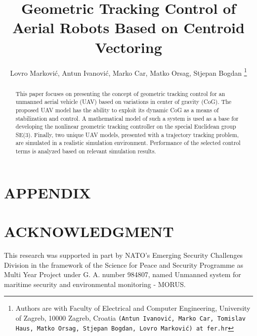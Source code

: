 \documentclass[letterpaper, 10 pt, conference]{ieeeconf}  %
\title{\LARGE \bf
Geometric Tracking Control of Aerial Robots Based on Centroid Vectoring
}
\author{Lovro Marković, Antun Ivanović, Marko Car, Matko Orsag, Stjepan Bogdan
	\thanks{Authors are with Faculty of Electrical and Computer Engineering,
        University of Zagreb, 10000 Zagreb, Croatia
        {\tt\small (Antun Ivanović, Marko Car, Tomislav Haus, Matko Orsag, Stjepan Bogdan, Lovro Marković) at fer.hr}}}%
\begin{document}
\maketitle

\thispagestyle{empty}
\pagestyle{empty}


\begin{abstract}

This paper focuses on presenting the concept of geometric tracking control for an unmanned aerial vehicle (UAV) based on variations in center of gravity (CoG). The proposed UAV model has the ability to exploit its dynamic CoG as a means of stabilization and control. A mathematical model of such a system is used as a base for developing the nonlinear geometric tracking controller on the special Euclidean group SE(3). Finally, two unique UAV models, presented with a trajectory tracking problem, are simulated in a realistic simulation environment. Performance of the selected control terms is analyzed based on relevant simulation results.

\end{abstract}




%




\section*{APPENDIX} \label{sec:appendix}



\section*{ACKNOWLEDGMENT}

This research was supported in part by NATO's Emerging Security Challenges Division in the framework of the Science for Peace and Security Programme as Multi Year Project under G. A. number 984807, named Unmanned system for maritime security and environmental monitoring - MORUS.



\nocite{*}


\end{document}

